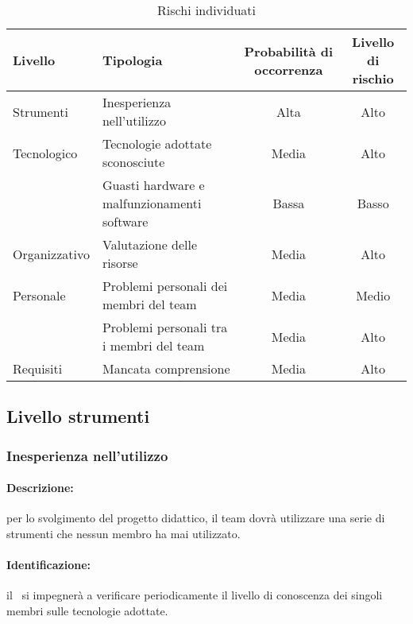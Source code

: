 \documentclass[../PianoProgetto.tex]{subfiles}
\begin{document}
	\begin{table}[h]
		\centering
		
		\begin{tabularx}{\textwidth}{X X C C}
			\toprule
			\textbf{Livello} 	& \textbf{Tipologia} 						& \textbf{Probabilità di occorrenza} & \textbf{Livello di rischio} \\
			\midrule
			Strumenti 	& Inesperienza nell'utilizzo 				& Alta 	& Alto \\
			\midrule
			Tecnologico	& Tecnologie adottate sconosciute 			& Media 	& Alto \\
					& Guasti hardware e malfunzionamenti software 	& Bassa 	& Basso \\
			\midrule
			Organizzativo& Valutazione delle risorse					& Media	& Alto \\
			\midrule
			Personale	& Problemi personali dei membri del team		& Media	& Medio \\
					& Problemi personali tra i membri del team		& Media	& Alto \\
			\midrule
			Requisiti	& Mancata comprensione					& Media	& Alto \\
			\bottomrule
		\end{tabularx}
		
		\caption{Rischi individuati}
		\label{tab:rischi}
		
	\end{table}


\subsection{Livello strumenti}

\subsubsection{Inesperienza nell’utilizzo}

	\paragraph*{Descrizione:} per lo svolgimento del progetto didattico, il team dovrà utilizzare una serie di strumenti che nessun membro ha mai utilizzato.
	
	\paragraph*{Identificazione:} il \responsabilediprogetto\ si impegnerà a verificare periodicamente il livello di conoscenza dei singoli membri sulle tecnologie adottate.
	
\end{document}
